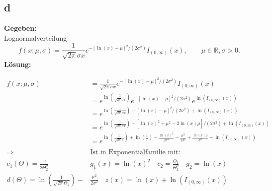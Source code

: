 \documentclass{article}
\begin{document}
\subsection*{d}
\textbf{Gegeben:}\\

Lognormalverteilung
\[f(x;\mu, \sigma) = \frac{1}{\sqrt{2\pi}\sigma x} e^{-[\ln(x) - \mu]^2/ (2\sigma^2)} I_{(0, \infty)}(x), \qquad \mu \in \mathbb{R}, \sigma > 0.\]
\textbf{Lösung:}

\begin{align*}
    f(x;\mu, \sigma) &= \frac{1}{\sqrt{2\pi}\sigma x} e^{-[\ln(x) - \mu]^2/ (2\sigma^2)} I_{(0, \infty)}(x) \\
    &= e^{\ln(\frac{1}{\sqrt{2 \pi}\sigma x})}e^{-[\ln(x) - \mu]^2/ (2\sigma^2)} e^{\ln(I_{(0, \infty)}(x))} \\
    &= e^{\ln(\frac{1}{\sqrt{2 \pi}\sigma x})-[\ln(x) - \mu]^2/ (2\sigma^2) + \ln(I_{(0, \infty)}(x))} \\
    &= e^{\ln(\frac{1}{\sqrt{2 \pi}\sigma x})- [\ln(x)^2 + \mu^2 - 2\ln(x)\mu]/ (2\sigma^2)+ \ln(I_{(0, \infty)}(x))} \\
    &= e^{\ln(\frac{1}{\sqrt{2 \pi}\sigma})+ \ln(\frac{1}{x})- \frac{\ln(x)^2}{2\sigma^2} - \frac{\mu^2}{2\sigma^2} + \frac{\ln(x)\mu}{\sigma^2} + \ln(I_{(0, \infty)}(x))} \\\\
    \Longrightarrow ~ &\text{Ist in Exponentialfamilie mit:} \\
    c_1(\Theta) = \frac{-1}{2\Theta_2^2} \quad & g_1(x) = \ln(x)^2 \quad c_2 = \frac{\Theta_1}{\Theta_2^2} \quad g_2 = \ln(x) \\
    d(\Theta) = \ln(\frac{1}{\sqrt{2\pi}\Theta_2}) - &\frac{\mu^2}{2\sigma^2}\quad z(x) = \ln(x) + \ln(I_{(0, \infty)}(x))
\end{align*}
\end{document}
